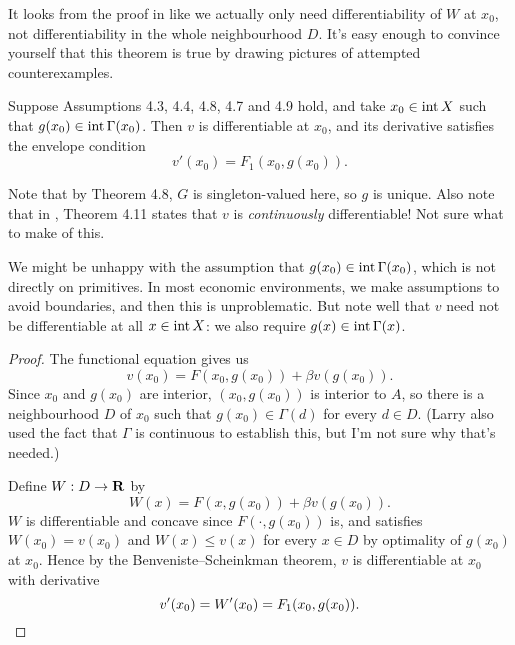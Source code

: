 \documentclass[11pt,letterpaper,reqno,oneside]{article}
\begin{document}
It looks from the proof in \textcite[][p. 84]{StokeyLucasPrescott1989} like we actually only need differentiability of $W$ at $x_0$, not differentiability in the whole neighbourhood $D$. It's easy enough to convince yourself that this theorem is true by drawing pictures of attempted counterexamples.


\begin{theorem}[SLP Th'm 4.11]
	Suppose Assumptions 4.3, 4.4, 4.8, 4.7 and 4.9 hold, and take $x_0 \in \operatorname*{int} X$ such that $g(x_0) \in \operatorname*{int} \Gamma(x_0)$. Then $v$ is differentiable at $x_0$, and its derivative satisfies the envelope condition
	\begin{equation*}
		v'(x_0) = F_1( x_0, g(x_0) ) .
	\end{equation*}
\end{theorem}


Note that by Theorem 4.8, $G$ is singleton-valued here, so $g$ is unique. Also note that in \textcite{StokeyLucasPrescott1989}, Theorem 4.11 states that $v$ is \emph{continuously} differentiable! Not sure what to make of this.

We might be unhappy with the assumption that $g(x_0) \in \operatorname*{int} \Gamma(x_0)$, which is not directly on primitives. In most economic environments, we make assumptions to avoid boundaries, and then this is unproblematic. But note well that $v$ need not be differentiable at all $x \in \operatorname*{int} X$: we also require $g(x) \in \operatorname*{int} \Gamma(x)$.

\begin{proof}
	The functional equation gives us
	\begin{equation*}
		v(x_0) = F(x_0,g(x_0)) + \beta v(g(x_0)) .
	\end{equation*}
	Since $x_0$ and $g(x_0)$ are interior, $(x_0,g(x_0))$ is interior to $A$, so there is a neighbourhood $D$ of $x_0$ such that $g(x_0) \in \Gamma(d)$ for every $d \in D$. (Larry also used the fact that $\Gamma$ is continuous to establish this, but I'm not sure why that's needed.)

	Define $W : D \to \mathbf{R}$ by
	\begin{equation*}
		W(x) = F(x,g(x_0)) + \beta v(g(x_0)) .
	\end{equation*}
	$W$ is differentiable and concave since $F(\cdot,g(x_0))$ is, and satisfies $W(x_0) = v(x_0)$ and $W(x) \leq v(x)$ for every $x \in D$ by optimality of $g(x_0)$ at $x_0$. Hence by the Benveniste--Scheinkman theorem, $v$ is differentiable at $x_0$ with derivative
	\begin{equation*}
		v'(x_0) = W'(x_0) = F_1(x_0,g(x_0)) . \qedhere
	\end{equation*}
\end{proof}
\end{document}
